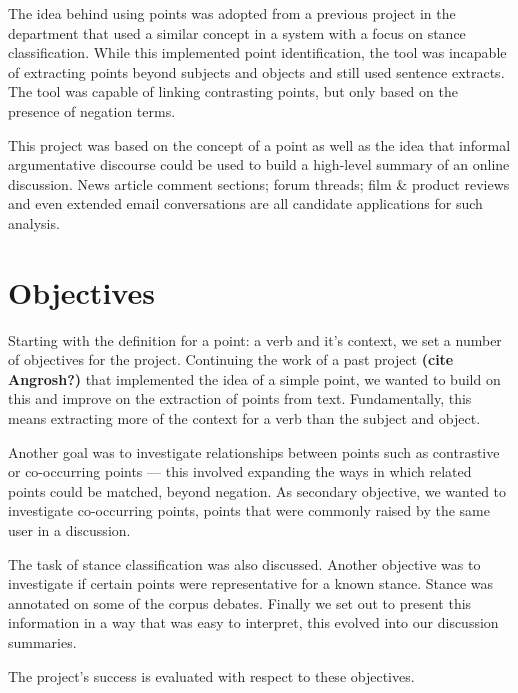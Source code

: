     The idea behind using points was adopted from a previous project in the department that used a similar concept in a system with a focus on stance classification. While this implemented point identification, the tool was incapable of extracting points beyond subjects and objects and still used sentence extracts. The tool was capable of linking contrasting points, but only based on the presence of negation terms.

    This project was based on the concept of a point as well as the idea that informal argumentative discourse could be used to build a high-level summary of an online discussion. News article comment sections; forum threads; film \& product reviews and even extended email conversations are all candidate applications for such analysis.

  \section{Objectives}
    Starting with the definition for a point: a verb and it's context, we set a number of objectives for the project. Continuing the work of a past project \textbf{(cite Angrosh?)} that implemented the idea of a simple point, we wanted to build on this and improve on the extraction of points from text. Fundamentally, this means extracting more of the context for a verb than the subject and object.

    Another goal was to investigate relationships between points such as contrastive or co-occurring points --- this involved expanding the ways in which related points could be matched, beyond negation. As secondary objective, we wanted to investigate co-occurring points, points that were commonly raised by the same user in a discussion.

    The task of stance classification was also discussed. Another objective was to investigate if certain points were representative for a known stance. Stance was annotated on some of the corpus debates. Finally we set out to present this information in a way that was easy to interpret, this evolved into our discussion summaries.

    The project's success is evaluated with respect to these objectives.
